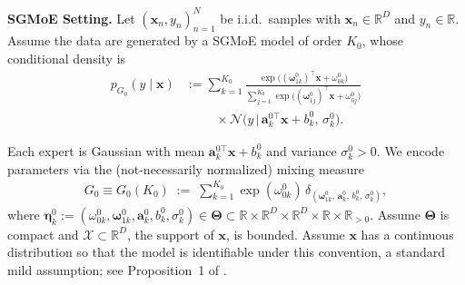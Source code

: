 \documentclass[twoside]{article}
\theoremstyle{plain}
\theoremstyle{definition}
\theoremstyle{plain}
\def\rvx{{\mathbf{x}}}
\def\vTheta{{\bm{\Theta}}}
\def\veta{{\bm{\eta}}}
\def\vomega{{\bm{\omega}}}
\def\va{{\bm{a}}}
\def\vx{{\bm{x}}}
\newcommand{\cN}{\mathcal{N}}
\newcommand{\cX}{\mathcal{X}}
\begin{document}
{\bf SGMoE Setting.}
Let $(\rvx_{n}, y_{n})_{n=1}^{N}$ be i.i.d.\ samples with $\rvx_{n}\in\mathbb{R}^{D}$ and $y_{n}\in\mathbb{R}$.
Assume the data are generated by a SGMoE model of order $K_{0}$, whose conditional density is
\begin{align}
p_{G_{0}}(y\mid \vx)
  &:=
  \sum_{k=1}^{K_{0}}
  \frac{\exp\!\big((\vomega_{1k}^{0})^{\top}\vx + \omega_{0k}^{0}\big)}
     {\sum_{j=1}^{K_{0}}
      \exp\!\big((\vomega_{1j}^{0})^{\top}\vx + \omega_{0j}^{0}\big)}\nonumber\\
  &\hspace{1cm} \times \cN\!\big(y \,\big|\, \va_{k}^{0\top}\vx + b_{k}^{0},\, \sigma_{k}^{0}\big).
\label{eq_mixture_expert_1}
\end{align}

Each expert is Gaussian with mean $\va_{k}^{0\top}\vx+b_{k}^{0}$ and variance $\sigma_{k}^{0}>0$. We encode parameters via the (not-necessarily normalized) mixing measure
\begin{align*}
    G_{0} \equiv G_{0}(K_0)
\;:=\;
\sum_{k=1}^{K_{0}}
\exp(\omega_{0k}^{0})\,
\delta_{(\vomega_{1k}^{0},\, \va_{k}^{0},\, b_{k}^{0},\, \sigma_{k}^{0})},
\end{align*}
where $\veta_{k}^{0}:=(\omega_{0k}^{0}, \vomega_{1k}^{0}, \va_{k}^{0}, b_{k}^{0}, \sigma_{k}^{0})
\in \vTheta \subset \mathbb{R} \times \mathbb{R}^{D} \times \mathbb{R}^{D} \times \mathbb{R} \times \mathbb{R}_{>0}$.
Assume $\vTheta$ is compact and $\cX\subset\mathbb{R}^{D}$, the support of $\rvx$, is bounded. 
Assume $\rvx$ has a continuous distribution so that the model is identifiable under this convention, a standard mild assumption; see Proposition~1 of \cite{nguyen_demystifying_2023}.
\end{document}
